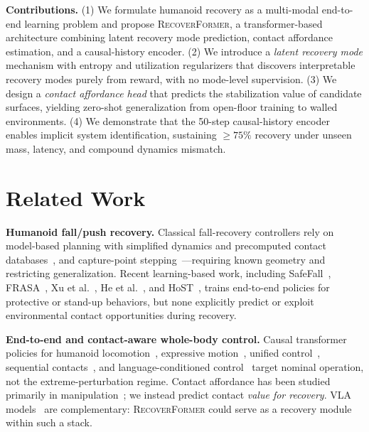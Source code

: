 \documentclass[conference,letterpaper]{IEEEtran}
\newcommand{\methodname}{\textsc{RecoverFormer}}
\begin{document}
\textbf{Contributions.}
(1) We formulate humanoid recovery as a multi-modal end-to-end learning problem and propose \methodname{}, a transformer-based architecture combining latent recovery mode prediction, contact affordance estimation, and a causal-history encoder.
(2) We introduce a \emph{latent recovery mode} mechanism with entropy and utilization regularizers that discovers interpretable recovery modes purely from reward, with no mode-level supervision.
(3) We design a \emph{contact affordance head} that predicts the stabilization value of candidate surfaces, yielding zero-shot generalization from open-floor training to walled environments.
(4) We demonstrate that the 50-step causal-history encoder enables implicit system identification, sustaining $\ge 75\%$ recovery under unseen mass, latency, and compound dynamics mismatch.

\section{Related Work}
\label{sec:related}

\textbf{Humanoid fall/push recovery.}
Classical fall-recovery controllers rely on model-based planning with simplified dynamics and precomputed contact databases~\cite{wang2017realtime,wang2018unified,wang2018realization}, and capture-point stepping~\cite{pushrecovery2023}---requiring known geometry and restricting generalization.
Recent learning-based work, including SafeFall~\cite{safefall2025}, FRASA~\cite{frasa2025}, Xu et al.~\cite{xu2025unified}, He et al.~\cite{he2025getup}, and HoST~\cite{host2025}, trains end-to-end policies for protective or stand-up behaviors, but none explicitly predict or exploit environmental contact opportunities during recovery.

\textbf{End-to-end and contact-aware whole-body control.}
Causal transformer policies for humanoid locomotion~\cite{radosavovic2024realworld,radosavovic2024humanoid}, expressive motion~\cite{cheng2024exbody,cheng2024exbody2}, unified control~\cite{he2025hover}, sequential contacts~\cite{zhang2024wococo}, and language-conditioned control~\cite{sentinel2025,shao2025langwbc,xue2025leverb,he2025asap,xie2025kungfubot} target nominal operation, not the extreme-perturbation regime.
Contact affordance has been studied primarily in manipulation~\cite{contactrich2025,tact2025,rtaffordance2024,xu2025a0}; we instead predict contact \emph{value for recovery}.
VLA models~\cite{pi0_2024,helix2025,groot2025,wholebodyvla2026} are complementary: \methodname{} could serve as a recovery module within such a stack.
\end{document}
